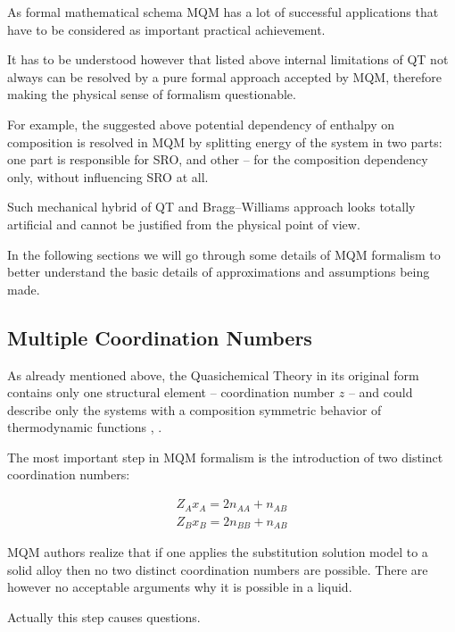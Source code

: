 \documentclass[12pt,abstract]{scrartcl}
\begin{document}
As formal mathematical schema MQM has a lot of successful applications that have to be considered as important practical achievement.

 It has to be understood however that listed above internal limitations of QT not always can be resolved by a pure formal approach accepted by MQM, therefore making the physical sense of formalism questionable. 

For example, the suggested above potential dependency of enthalpy on composition is resolved in MQM \cite{Pelton2007} by splitting energy of the system in two parts: one part is responsible for SRO, and other -- for the composition dependency only, without influencing SRO at all. 

Such mechanical hybrid of QT and Bragg–Williams approach looks totally artificial and cannot be justified from the physical point of view.


In the following sections we will go through some details of MQM formalism to better understand the basic details of  approximations and assumptions being made.   




\subsection{Multiple Coordination Numbers}
As already mentioned above, the Quasichemical Theory in its original form contains only one structural element -- coordination number $z$ -- and could describe only the systems with a composition symmetric  behavior of thermodynamic functions \cite{Hillert2008}, \cite{GUGGENHEIM1952}.






The most important step in MQM formalism is the introduction of two distinct coordination numbers:

\begin{equation} \label{cb}
\begin{split}
Z_A x_A = 2 n_{AA} + n_{AB}\\
Z_B  x_B = 2 n_{BB} + n_{AB}
\end{split}
\end{equation}

MQM authors realize \cite{Pelton_p1} that if one applies  the  substitution solution model to a solid  alloy then no two distinct coordination numbers are possible. There are however no acceptable arguments why it is possible in a liquid. 

Actually this step causes  questions. 
\end{document}
